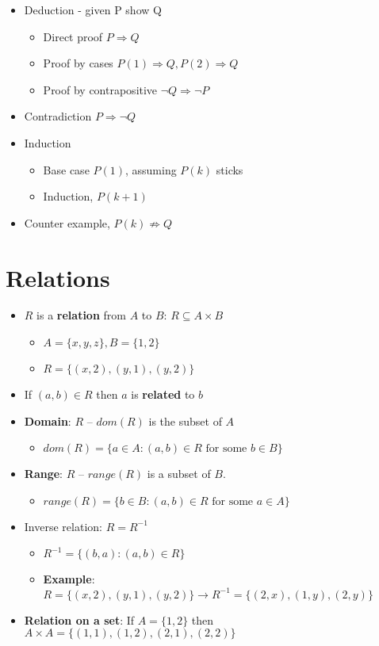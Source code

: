 \documentclass[english,10pt,a4paper]{article}
\begin{document}
\begin{itemize}
\item Deduction - given P show Q
\begin{itemize}
\item Direct proof $P \Rightarrow Q$
\item Proof by cases $P(1) \Rightarrow Q, P(2) \Rightarrow Q$
\item Proof by contrapositive $\neg Q \Rightarrow \neg P$
\end{itemize}
\item Contradiction $P \Rightarrow \neg Q$
\item Induction
\begin{itemize}
\item Base case $P(1)$, assuming $P(k)$ sticks
\item Induction, $P(k+1)$
\end{itemize}
\item Counter example, $P(k) \not \Rightarrow Q$
\end{itemize}


\newpage
\section{Relations}
\begin{theo}[Basic] 
\begin{itemize}
\item $R$ is a \textbf{relation} from $A$ to $B$: $R \subseteq A \times B$
\begin{itemize}
\item $A=\{x,y,z\}, B=\{1,2\}$
\item[] $R=\{(x,2),(y,1), (y,2) \}$
\end{itemize}
\item If $(a,b) \in R$ then $a$ is \textbf{related} to $b$
\item \textbf{Domain}: $R$ -- $dom(R)$ is the subset of $A$
\begin{itemize}
\item $dom(R)=\{a \in A: (a,b) \in R \text{ for some } b \in B\}$
\end{itemize}
\item \textbf{Range}: $R$ -- $range(R)$ is a subset of $B$.
\begin{itemize}
\item $range(R)=\{b \in B: (a,b) \in R \text{ for some } a \in A\}$
\end{itemize}
\item Inverse relation: $R = R^{-1}$
\begin{itemize}
\item $R^{-1} = \{(b,a):(a,b) \in R\}$
\item \textbf{Example}: $R=\{(x,2),(y,1),(y,2)\} \rightarrow R^{-1}=\{(2,x),(1,y),(2,y)\}$
\end{itemize}
\item \textbf{Relation on a set}: If $A=\{1,2\}$ then $A \times A = \{(1,1),(1,2),(2,1),(2,2)\}$
\end{itemize}
\end{theo}
\end{document}
